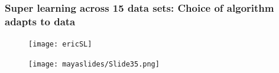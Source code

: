 \documentclass[t]{beamer}
\begin{document}
\begin{frame}
  \frametitle{Super learning across 15 data sets: Choice of algorithm adapts to data}
  \vspace{-.5in}
  \begin{figure}
  \texttt{[image: ericSL]}
  \end{figure}
\end{frame}

\begin{frame}
  \vspace{-.1in}
  \begin{figure}
  \texttt{[image: mayaslides/Slide35.png]}
  \end{figure}
\end{frame}

\end{document}

